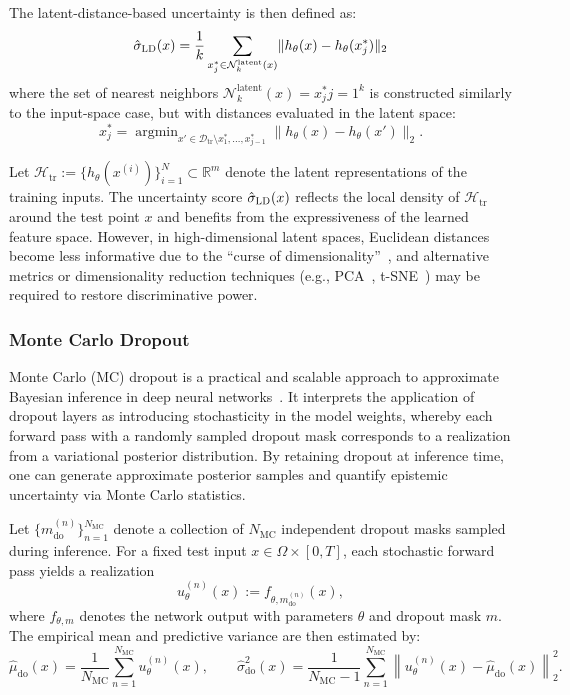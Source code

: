 \documentclass[preprint,12pt]{elsarticle}
\begin{document}
The latent-distance-based uncertainty is then defined as:
\begin{equation}
\hat\sigma_{\textsc{LD}}(x)
= \frac{1}{k} \sum_{x_j^\ast \in \mathcal N_k^{\text{latent}}(x)} \lVert h_{\theta}(x) - h_{\theta}(x_j^\ast) \rVert_2
\label{eq:ld_hu}
\end{equation}
where the set of nearest neighbors $\mathcal N_k^{\text{latent}}(x) = {x_j^\ast}{j=1}^{k}$ is constructed similarly to the input-space case, but with distances evaluated in the latent space:
\begin{equation}
x_j^\ast = \operatorname{\arg\min}_{x' \in \mathcal D_{\mathrm{tr}} \setminus {x_1^\ast, \dots, x_{j-1}^\ast}} \lVert h_{\theta}(x) - h_{\theta}(x') \rVert_2.
\end{equation}

Let $\mathcal{H}_{\mathrm{tr}} := \{h_{\theta}(x^{(i)})\}_{i=1}^{N} \subset \mathbb{R}^{m}$ denote the latent representations of the training inputs. The uncertainty score $\hat\sigma_{\textsc{LD}}(x)$ reflects the local density of $\mathcal{H}_{\mathrm{tr}}$ around the test point $x$ and benefits from the expressiveness of the learned feature space. However, in high-dimensional latent spaces, Euclidean distances become less informative due to the “curse of dimensionality”~\cite{beyer1999nearest}, and alternative metrics or dimensionality reduction techniques (e.g., PCA~\cite{abdi2010principal}, t-SNE~\cite{maaten2008visualizing}) may be required to restore discriminative power.


\subsubsection{Monte Carlo Dropout}
\label{sec:sub:mc_do}

Monte Carlo (MC) dropout is a practical and scalable approach to approximate Bayesian inference in deep neural networks~\cite{gal_dropout_2016}. It interprets the application of dropout layers as introducing stochasticity in the model weights, whereby each forward pass with a randomly sampled dropout mask corresponds to a realization from a variational posterior distribution. By retaining dropout at inference time, one can generate approximate posterior samples and quantify epistemic uncertainty via Monte Carlo statistics.

Let $\{m_{\mathrm{do}}^{(n)}\}_{n=1}^{N_{\mathrm{MC}}}$ denote a collection of $N_{\mathrm{MC}}$ independent dropout masks sampled during inference. For a fixed test input $x \in \Omega \times [0,T]$, each stochastic forward pass yields a realization
\[
u_\theta^{(n)}(x) := f_{\theta, m_{\mathrm{do}}^{(n)}}(x),
\]
where $f_{\theta, m}$ denotes the network output with parameters $\theta$ and dropout mask $m$. The empirical mean and predictive variance are then estimated by:
\begin{equation}
\hat{\mu}_{\mathrm{do}}(x) = \frac{1}{N_{\mathrm{MC}}} \sum_{n=1}^{N_{\mathrm{MC}}} u_\theta^{(n)}(x), 
\qquad
\hat{\sigma}_{\mathrm{do}}^2(x) = \frac{1}{N_{\mathrm{MC}} - 1} \sum_{n=1}^{N_{\mathrm{MC}}} \left\| u_\theta^{(n)}(x) - \hat{\mu}_{\mathrm{do}}(x) \right\|_2^2.
\label{eq:do_mean_var}
\end{equation}
\end{document}
